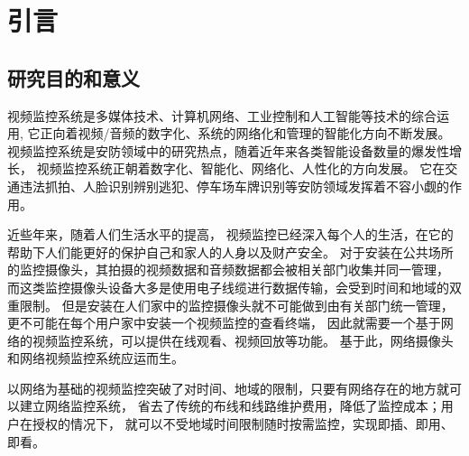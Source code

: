 \chapter{引言}
\section{研究目的和意义}
视频监控系统是多媒体技术、计算机网络、工业控制和人工智能等技术的综合运用,
它正向着视频/音频的数字化、系统的网络化和管理的智能化方向不断发展\cite{宋磊2003视频监控系统概述}。
视频监控系统是安防领域中的研究热点，随着近年来各类智能设备数量的爆发性增长，
视频监控系统正朝着数字化、智能化、网络化、人性化的方向发展。
它在交通违法抓拍、人脸识别辨别逃犯、停车场车牌识别等安防领域发挥着不容小觑的作用。

近些年来，随着人们生活水平的提高，
视频监控已经深入每个人的生活，在它的帮助下人们能更好的保护自己和家人的人身以及财产安全。
对于安装在公共场所的监控摄像头，其拍摄的视频数据和音频数据都会被相关部门收集并同一管理，
而这类监控摄像头设备大多是使用电子线缆进行数据传输，会受到时间和地域的双重限制。
但是安装在人们家中的监控摄像头就不可能做到由有关部门统一管理，
更不可能在每个用户家中安装一个视频监控的查看终端，
因此就需要一个基于网络的视频监控系统，可以提供在线观看、视频回放等功能。
基于此，网络摄像头和网络视频监控系统应运而生。

以网络为基础的视频监控突破了对时间、地域的限制，只要有网络存在的地方就可以建立网络监控系统，
省去了传统的布线和线路维护费用，降低了监控成本；用户在授权的情况下，
就可以不受地域时间限制随时按需监控，实现即插、即用、即看\cite{网络视频监控技术的未来发展趋势}。



